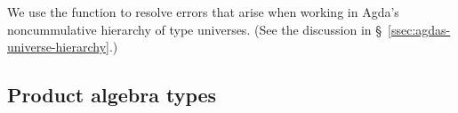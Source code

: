 \documentclass[a4paper,UKenglish,cleveref,autoref,thm-restate,11pt]{lipics-v2021}
\begin{document}
\begin{code}
%
\>[1]\AgdaSpace{}%
\AgdaSpace{}%
\AgdaSpace{}%
\AgdaSymbol{=}\AgdaSpace{}%
\AgdaSpace{}%
\AgdaSpace{}%
\AgdaSpace{}%
\AgdaSpace{}%
\AgdaOperator{\AgdaInductiveConstructor{,}}\AgdaSpace{}%
\AgdaSpace{}%
\AgdaSymbol{(}\AgdaSpace{}%
\AgdaSymbol{:}\AgdaSpace{}%
\AgdaSpace{}%
\AgdaSpace{}%
\AgdaSymbol{)}\AgdaSpace{}%
\AgdaSpace{}%
\AgdaSpace{}%
\AgdaSymbol{(}\AgdaSpace{}%
\AgdaSpace{}%
\AgdaSymbol{)}\AgdaSpace{}%
\AgdaSymbol{)}\<%
\end{code}
\ccpad
We use the function  to resolve errors that arise when working in Agda's noncummulative hierarchy of type universes. (See the discussion in \S~\ref{ssec:agdas-universe-hierarchy}.)


















\subsection{Product algebra types}\label{product-algebra-type}
\end{document}
